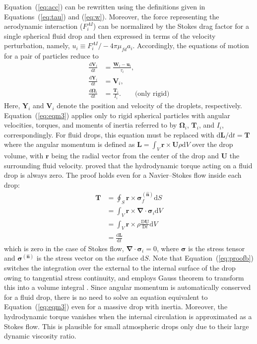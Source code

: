 \documentclass[../thesis.tex]{subfiles}
\begin{document}
Equation~(\ref{eq:acc}) can be rewritten using the definitions given in Equations~(\ref{eq:tau}) and (\ref{eq:w}). Moreover, the force representing the aerodynamic interaction ($F_i^{AI}$) can be normalized by the Stokes drag factor for a single spherical fluid drop and then expressed in terms of the velocity perturbation, namely, \mbox{$u_i \equiv F_i^{AI} / -4\pi\mu_{fd}a_i$}. Accordingly, the equations of motion for a pair of particles reduce to
\begin{align}
\frac{\text{d} \boldsymbol{V}_i}{\text{d} t} &= \frac{\boldsymbol{W}_i-\boldsymbol{u}_i}{\tau_i}, \label{eq:eqm1} \\
\frac{\text{d} \boldsymbol{Y}_i}{\text{d} t} &= \boldsymbol{V}_i, \label{eq:eqm2} \\
\frac{\text{d} \boldsymbol{\Omega}_i}{\text{d} t} &= \frac{\boldsymbol{T}_i}{I_i}. \qquad \text{(only rigid)} \label{eq:eqm3}
\end{align}
Here, $\boldsymbol{Y}_i$ and $\boldsymbol{V}_i$ denote the position and velocity of the droplets, respectively. Equation~(\ref{eq:eqm3}) applies only to rigid spherical particles with angular velocities, torques, and moments of inertia referred to by $\boldsymbol{\Omega}_i$, $\boldsymbol{T}_i$, and $I_i$, correspondingly. For fluid drops, this equation must be replaced with $\text{d}\boldsymbol{L}/\text{d}t = \boldsymbol{T}$ where the angular momentum is defined as $\boldsymbol{L} = \int_V\boldsymbol{r}\times\boldsymbol{U}\rho\text{d}V$ over the drop volume, with $\boldsymbol{r}$ being the radial vector from the center of the drop and $\boldsymbol{U}$ the surrounding fluid velocity. \cite{Z80} proved that the hydrodynamic torque acting on a fluid drop is always zero. The proof holds even for a Navier--Stokes flow inside each drop:
\begin{subequations}
\begin{align}
\boldsymbol{T} &= \oint_S \boldsymbol{r} \times \boldsymbol{\sigma}_f^{(\boldsymbol{\hat{n}})} \text{d}S \\
&= \int_V\boldsymbol{r}\times\boldsymbol{\nabla \cdot \sigma}_i \text{d}V \label{eq:proofb} \\
&= \int_V\boldsymbol{r} \times \rho \frac{\text{D}\boldsymbol{U}}{\text{D}t} \text{d}V \\
&= \frac{\text{d}\boldsymbol{L}}{\text{d}t}
\end{align}
\end{subequations}
which is zero in the case of Stokes flow, $\boldsymbol{\nabla \cdot \sigma}_i = 0$, where $\boldsymbol{\sigma}$ is the stress tensor and $\boldsymbol{\sigma}^{(\boldsymbol{\hat{n}})}$ is the stress vector on the surface $\text{d}S$. Note that Equation~(\ref{eq:proofb}) switches the integration over the external to the internal surface of the drop owing to tangential stress continuity, and employs Gauss theorem to transform this into a volume integral \citep{Z80}. Since angular momentum is automatically conserved for a fluid drop, there is no need to solve an equation equivalent to Equation~(\ref{eq:eqm3}) even for a massive drop with inertia. Moreover, the hydrodynamic torque vanishes when the internal circulation is approximated as a Stokes flow. This is plausible for small atmospheric drops only due to their large dynamic viscosity ratio. 
\end{document}
